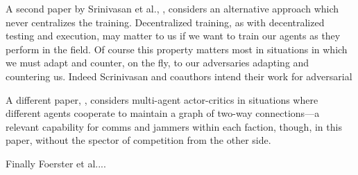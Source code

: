 \documentclass{article}
\begin{document}
A second paper by Srinivasan et al., \cite{srinivasan2018actor},
considers an alternative approach which never centralizes the
training.  Decentralized training, as with decentralized testing and
execution, may matter to us if we want to train our agents as they
perform in the field.  Of course this property matters most in
situations in which we must adapt and counter, on the fly, to our
adversaries adapting and countering us.  Indeed Scrinivasan and
coauthors intend their work for adversarial

A different paper, \cite{su2020counterfactual}, considers multi-agent
actor-critics in situations where different agents cooperate to
maintain a graph of two-way connections---a relevant capability for
comms and jammers within each faction, though, in this paper, without
the spector of competition from the other side.

Finally Foerster et al....


% 

\end{document}
